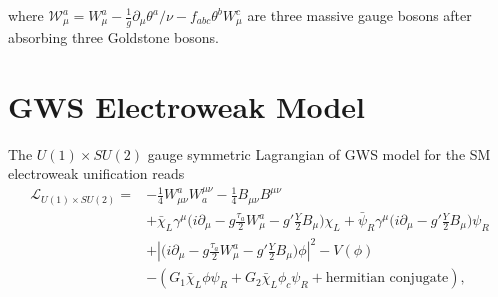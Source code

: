 \noindent where $\mathcal{W}^a_\mu = W^a_\mu - \frac{1}{g} \partial_\mu \theta^a / \nu - f_{abc}\theta^b W^c_\mu$ are three massive gauge bosons after absorbing three Goldstone bosons.



\section{GWS Electroweak Model}
\label{sec:physics:qft:gws}
The $U(1) \times SU(2)$ gauge symmetric Lagrangian of GWS model for the SM electroweak unification reads 
\begin{equation}
\begin{split}
    \mathcal{L}_{U(1)\times SU(2)} =&  - \frac{1}{4}W^a_{\mu\nu}W^{\mu\nu}_a - \frac{1}{4}B_{\mu\nu}B^{\mu\nu} \\
    & + \bar{\chi}_L \gamma^\mu \big( i \partial_\mu -g \frac{\tau_a}{2} W^a_\mu -g'\frac{Y}{2} B_\mu \big) \chi_L 
    + \bar{\psi}_R \gamma^\mu \big( i \partial_\mu -g'\frac{Y}{2} B_\mu \big) \psi_R \\
    & + \left\lvert  \big( i \partial_\mu -g \frac{\tau_a}{2} W^a_\mu -g'\frac{Y}{2} B_\mu \big)\phi \right\rvert ^2 - V(\phi) \\
    & -(G_1 \bar{\chi}_L \phi \psi_R + G_2 \bar{\chi}_L \phi_c \psi_R + \text{hermitian conjugate}) ,
\end{split}
\label{eqn:physics:qft:gws:lagragian}
\end{equation}

